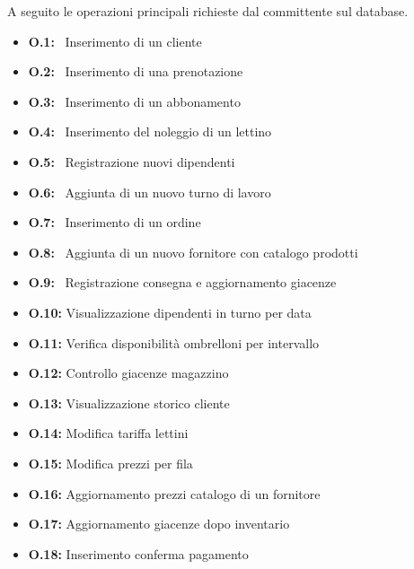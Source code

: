 A seguito le operazioni principali richieste dal committente sul database.

\begin{itemize}[itemsep=1pt, topsep=0pt]
    \item \textbf{O.1:} \ Inserimento di un cliente
    \item \textbf{O.2:} \ Inserimento di una prenotazione
    \item \textbf{O.3:} \ Inserimento di un abbonamento
    \item \textbf{O.4:} \ Inserimento del noleggio di un lettino
    \item \textbf{O.5:} \ Registrazione nuovi dipendenti
    \item \textbf{O.6:} \ Aggiunta di un nuovo turno di lavoro
    \item \textbf{O.7:} \ Inserimento di un ordine
    \item \textbf{O.8:} \ Aggiunta di un nuovo fornitore con catalogo prodotti
    \item \textbf{O.9:} \ Registrazione consegna e aggiornamento giacenze
    \item \textbf{O.10:} Visualizzazione dipendenti in turno per data
    \item \textbf{O.11:} Verifica disponibilit\`{a} ombrelloni per intervallo
    \item \textbf{O.12:} Controllo giacenze magazzino
    \item \textbf{O.13:} Visualizzazione storico cliente
    \item \textbf{O.14:} Modifica tariffa lettini
    \item \textbf{O.15:} Modifica prezzi per fila
    \item \textbf{O.16:} Aggiornamento prezzi catalogo di un fornitore
    \item \textbf{O.17:} Aggiornamento giacenze dopo inventario
    \item \textbf{O.18:} Inserimento conferma pagamento
\end{itemize}

